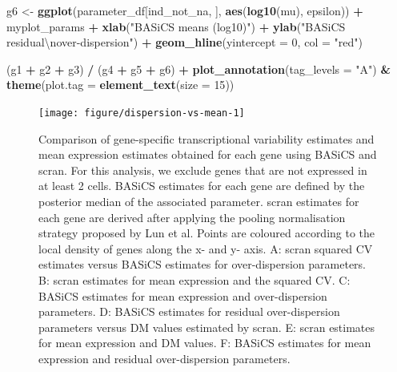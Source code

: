 \documentclass[9pt,a4paper,]{extarticle}
\newenvironment{Shaded}{\begin{snugshade}}{\end{snugshade}}
\newcommand{\CharTok}[1]{\textcolor[rgb]{0.31,0.60,0.02}{#1}}
\newcommand{\DataTypeTok}[1]{\textcolor[rgb]{0.13,0.29,0.53}{#1}}
\newcommand{\DecValTok}[1]{\textcolor[rgb]{0.00,0.00,0.81}{#1}}
\newcommand{\KeywordTok}[1]{\textcolor[rgb]{0.13,0.29,0.53}{\textbf{#1}}}
\newcommand{\NormalTok}[1]{#1}
\newcommand{\OperatorTok}[1]{\textcolor[rgb]{0.81,0.36,0.00}{\textbf{#1}}}
\newcommand{\StringTok}[1]{\textcolor[rgb]{0.31,0.60,0.02}{#1}}
\begin{document}
\begin{Shaded}
\begin{Highlighting}[]
\NormalTok{g6 <-}\StringTok{ }\KeywordTok{ggplot}\NormalTok{(parameter_df[ind_not_na, ], }\KeywordTok{aes}\NormalTok{(}\KeywordTok{log10}\NormalTok{(mu), epsilon)) }\OperatorTok{+}
\StringTok{  }\NormalTok{myplot_params }\OperatorTok{+}
\StringTok{  }\KeywordTok{xlab}\NormalTok{(}\StringTok{"BASiCS means (log10)"}\NormalTok{) }\OperatorTok{+}
\StringTok{  }\KeywordTok{ylab}\NormalTok{(}\StringTok{"BASiCS residual}\CharTok{\textbackslash{}n}\StringTok{over-dispersion"}\NormalTok{) }\OperatorTok{+}
\StringTok{  }\KeywordTok{geom_hline}\NormalTok{(}\DataTypeTok{yintercept =} \DecValTok{0}\NormalTok{, }\DataTypeTok{col =} \StringTok{"red"}\NormalTok{)}

\NormalTok{(g1 }\OperatorTok{+}\StringTok{ }\NormalTok{g2 }\OperatorTok{+}\StringTok{ }\NormalTok{g3) }\OperatorTok{/}\StringTok{ }\NormalTok{(g4 }\OperatorTok{+}\StringTok{ }\NormalTok{g5 }\OperatorTok{+}\StringTok{ }\NormalTok{g6) }\OperatorTok{+}\StringTok{ }
\StringTok{  }\KeywordTok{plot_annotation}\NormalTok{(}\DataTypeTok{tag_levels =} \StringTok{"A"}\NormalTok{) }\OperatorTok{&}\StringTok{ }\KeywordTok{theme}\NormalTok{(}\DataTypeTok{plot.tag =} \KeywordTok{element_text}\NormalTok{(}\DataTypeTok{size =} \DecValTok{15}\NormalTok{))}
\end{Highlighting}
\end{Shaded}

\begin{figure}

{\centering \texttt{[image: figure/dispersion-vs-mean-1]} 

}

\caption{Comparison of gene-specific transcriptional variability estimates and mean expression estimates obtained for each gene using BASiCS and scran. For this analysis, we exclude genes that are not expressed in at least 2 cells. BASiCS estimates for each gene are defined by the posterior median of the associated parameter. scran estimates for each gene are derived after applying the pooling normalisation strategy proposed by Lun et al. Points are coloured according to the local density of genes along the x- and y- axis. A: scran squared CV estimates versus BASiCS estimates for over-dispersion parameters. B: scran estimates for mean expression and the squared CV. C: BASiCS estimates for mean expression and over-dispersion parameters. D: BASiCS estimates for residual over-dispersion parameters versus DM values estimated by scran. E: scran estimates for mean expression and DM values. F: BASiCS estimates for mean expression and residual over-dispersion parameters.}\label{fig:dispersion-vs-mean}
\end{figure}
\end{document}
